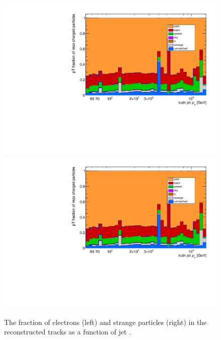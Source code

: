 \begin{figure}
\centering
\includegraphics[scale=0.3, page=8]{figures/jet_comp_study_powheg_Tight_pTFraction.pdf}
\includegraphics[scale=0.3, page=9]{figures/jet_comp_study_powheg_Tight_pTFraction.pdf}
\caption {The fraction of electrons (left) and strange particles (right) in the reconstructed tracks as a function of jet \pT.}
\label{fig:response electrons and starnge particles}
\end{figure}